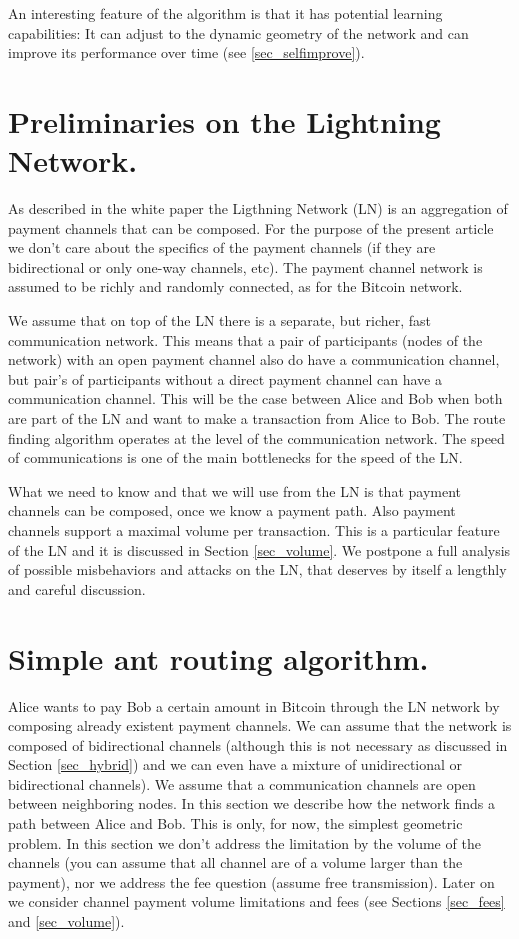 \documentclass[12pt]{amsart}
\theoremstyle{remark}
\begin{document}
An interesting feature of the algorithm is that it has potential learning capabilities: It can adjust to the 
dynamic geometry of the network and can improve its performance over time (see \ref{sec_selfimprove}).

\section{Preliminaries on the Lightning Network.}

As described in the white paper \cite{PD15} the Ligthning Network (LN) is an aggregation of payment 
channels that can be composed. For the purpose of the present article we don't care about the specifics of 
the payment channels (if they are bidirectional or only one-way channels, etc). The payment channel network 
is assumed to be richly and randomly connected, as for the Bitcoin network.

\medskip

We assume that on top of the LN there is a separate, but richer, fast communication network. 
This means that a pair of participants (nodes of the network)
with an open payment channel also do have a communication channel, but pair's of participants 
without a direct payment channel can have a communication channel. This will be the case 
between Alice and Bob when both are part of the LN and want to make a transaction from Alice to Bob.
The route finding algorithm operates at the level of the communication network. The speed of communications
is one of the main bottlenecks for the speed of the LN.

\medskip

What we need to know and that we will use from the LN is that payment channels can be composed, once we know a 
payment path. Also payment channels support a maximal volume per transaction. This is a particular feature 
of the LN and it is discussed in Section \ref{sec_volume}.
We postpone a full analysis of possible misbehaviors and attacks on the LN, that deserves by itself a lengthly 
and careful discussion. 


\section{Simple ant routing algorithm.}\label{sec_algo}


Alice wants to pay Bob a certain amount in Bitcoin through the LN network by composing already 
existent payment channels. We can assume that the network is 
composed of bidirectional channels (although this is not necessary as discussed in Section \ref{sec_hybrid})
and we can even have a mixture of unidirectional or bidirectional channels). 
We assume that a communication channels are open between neighboring nodes. 
In this section we describe 
how the network finds a path between Alice and Bob. This is only, for now, the simplest 
geometric problem.
In this section we don't address the limitation 
by the volume of the channels (you can assume that all channel are of 
a volume larger than the payment), nor we address the fee question (assume free transmission). 
Later on we consider channel payment volume limitations and fees (see Sections \ref{sec_fees} and \ref{sec_volume}). 
\end{document}
